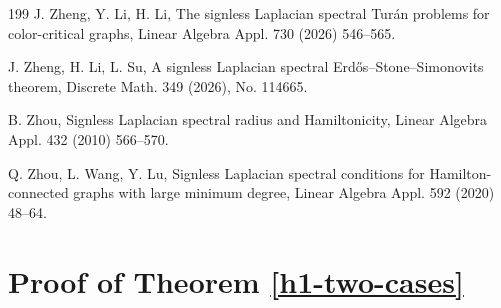 \documentclass[11pt,a4paper]{article}
\theoremstyle{plain}
\theoremstyle{definition}
\begin{document}
\begin{thebibliography}{199}
J. Zheng, Y. Li, H. Li, 
The signless Laplacian spectral Tur\'{a}n problems for color-critical graphs, 
Linear Algebra Appl. 730 (2026) 546--565. 

J. Zheng, H. Li, L. Su, 
A signless Laplacian spectral Erd\H{o}s--Stone--Simonovits theorem, 
Discrete Math. 349 (2026), No. 114665. 

B. Zhou,
Signless Laplacian spectral radius and Hamiltonicity,
Linear Algebra Appl. 432 (2010) 566--570.

Q. Zhou, L. Wang, Y. Lu, 
Signless Laplacian spectral conditions for Hamilton-connected graphs with large minimum degree, 
Linear Algebra Appl. 592 (2020) 48--64.



\end{thebibliography}


\appendix 


\section{Proof of Theorem \ref{h1-two-cases}} 
\label{sec-A}
\end{document}

